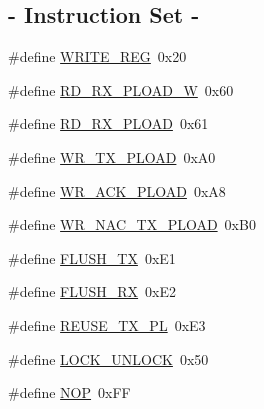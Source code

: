 \subsection*{-\/ Instruction Set -\/}
\begin{DoxyCompactItemize}
\item 
\#define \hyperlink{group__nordic__hal__nrf__reg_gab4589895853859c8ae1e26287efa3c1d}{WRITE\_\-REG}~0x20
\item 
\#define \hyperlink{group__nordic__hal__nrf__reg_ga68bca2b1429420aa46d2da0b2830e1b1}{RD\_\-RX\_\-PLOAD\_\-W}~0x60
\item 
\#define \hyperlink{group__nordic__hal__nrf__reg_ga34e32f32935efe2d958ca16d48831009}{RD\_\-RX\_\-PLOAD}~0x61
\item 
\#define \hyperlink{group__nordic__hal__nrf__reg_ga97a60093aef6135e38bd0bd91cd40428}{WR\_\-TX\_\-PLOAD}~0xA0
\item 
\#define \hyperlink{group__nordic__hal__nrf__reg_ga07b82f8a30b55b02b77c87d6d4953f6d}{WR\_\-ACK\_\-PLOAD}~0xA8
\item 
\#define \hyperlink{group__nordic__hal__nrf__reg_ga475a03dfa6b8358e02ac25c1bc8a5de7}{WR\_\-NAC\_\-TX\_\-PLOAD}~0xB0
\item 
\#define \hyperlink{group__nordic__hal__nrf__reg_gabce47e8066832b6ac4e18162a79859b4}{FLUSH\_\-TX}~0xE1
\item 
\#define \hyperlink{group__nordic__hal__nrf__reg_gab2418a6171d7f1eefd458927fdfe7057}{FLUSH\_\-RX}~0xE2
\item 
\#define \hyperlink{group__nordic__hal__nrf__reg_ga2f1d9bb858232e8b1494b60aa9a7d25a}{REUSE\_\-TX\_\-PL}~0xE3
\item 
\#define \hyperlink{group__nordic__hal__nrf__reg_gaa74c0e2b8dd2aa10ae94ccb3ae228e0f}{LOCK\_\-UNLOCK}~0x50
\item 
\#define \hyperlink{group__nordic__hal__nrf__reg_ga700f88377bf36711b711f69b06c52f5d}{NOP}~0xFF
\end{DoxyCompactItemize}
